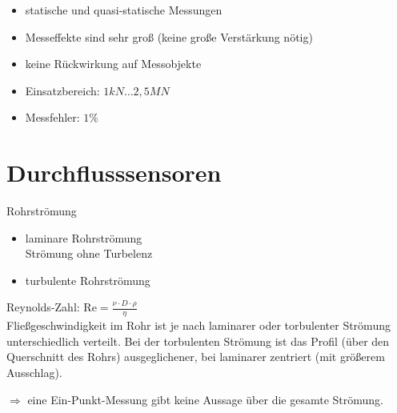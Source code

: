 \documentclass{scrreprt}
\begin{document}
\begin{itemize}
\item statische und quasi-statische Messungen
\item Messeffekte sind sehr groß (keine große Verstärkung nötig)
\item keine Rückwirkung auf Messobjekte
\item Einsatzbereich: $1 \unit{kN}\ldots 2,5 \unit{MN}$
\item Messfehler: $1\%$
\end{itemize}

\chapter{Durchflusssensoren}
Rohrströmung
\begin{itemize}
\item laminare Rohrströmung\\
Strömung ohne Turbelenz
\item turbulente Rohrströmung
\end{itemize}
Reynolds-Zahl: $\mathrm{Re}=\frac{\nu \cdot D \cdot \rho}{\eta}$\\
Fließgeschwindigkeit im Rohr ist je nach laminarer oder torbulenter Strömung unterschiedlich verteilt. Bei der torbulenten Strömung ist das Profil (über den Querschnitt des Rohrs) ausgeglichener, bei laminarer zentriert (mit größerem Ausschlag).

$\Rightarrow$ eine Ein-Punkt-Messung gibt keine Aussage über die gesamte Strömung.
\end{document}
